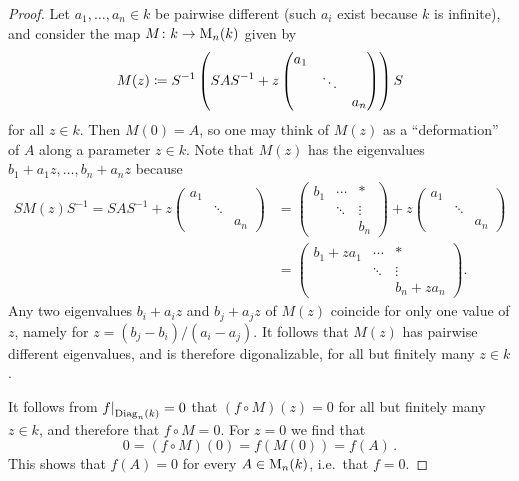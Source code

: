 \begin{proof}
  Let $a_1, \dotsc, a_n \in k$ be pairwise different (such $a_i$ exist because $k$ is infinite), and consider the map $M \colon k \to \operatorname{M}_n(k)$ given by
  \[
              M(z)
    \coloneqq  S^{-1}
              \left(
              S A S^{-1}
              + z
              \begin{pmatrix}
                a_1 &         &     \\
                    & \ddots  &     \\
                    &         & a_n
              \end{pmatrix}
              \right)
              S
  \]
  for all $z \in k$.
  Then $M(0) = A$, so one may think of $M(z)$ as a \enquote{deformation} of $A$ along a parameter $z \in k$.
  Note that $M(z)$ has the eigenvalues $b_1 + a_1 z, \dotsc, b_n + a_n z$ because
  \begin{align*}
      S M(z) S^{-1}
    =     S A S^{-1}
        + z
        \begin{pmatrix}
          a_1 &         &     \\
              & \ddots  &     \\
              &         & a_n
        \end{pmatrix}
    &=  \begin{pmatrix}
          b_1 & \cdots  & *       \\
              & \ddots  & \vdots  \\
              &         & b_n
        \end{pmatrix}
        + z
        \begin{pmatrix}
          a_1 &         &     \\
              & \ddots  &     \\
              &         & a_n
        \end{pmatrix} \\
    &=  \begin{pmatrix}
          b_1 + z a_1 & \cdots  & *           \\
                      & \ddots  & \vdots      \\
                      &         & b_n + z a_n
        \end{pmatrix}.
  \end{align*}
  Any two eigenvalues $b_i + a_i z$ and $b_j + a_j z$ of $M(z)$ coincide for only one value of $z$, namely for $z = (b_j - b_i)/(a_i - a_j)$.
  It follows that $M(z)$ has pairwise different eigenvalues, and is therefore digonalizable, for all but finitely many $z \in k$.
  
  It follows from $\restrict{f}{\Diag_n(k)} = 0$ that $(f \circ M)(z) = 0$ for all but finitely many $z \in k$, and therefore that $f \circ M = 0$.
  For $z = 0$ we find that
  \[
      0
    = (f \circ M)(0)
    = f(M(0))
    = f(A) \,.
  \]
  This shows that $f(A) = 0$ for every $A \in \operatorname{M}_n(k)$, i.e.\ that $f = 0$.
\end{proof}


